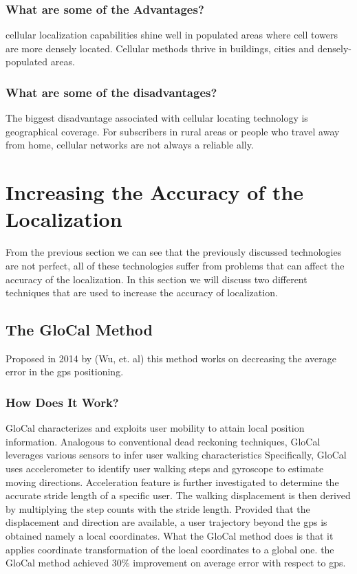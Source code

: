 \subsubsection{What are some of the Advantages?}
cellular localization  capabilities shine well in populated areas where cell towers are more densely located.
Cellular methods thrive in buildings, cities and densely-populated areas.\cite{web:agmonitoring}

\subsubsection{What are some of the disadvantages?}
The biggest disadvantage associated with cellular locating technology is geographical coverage.
For subscribers in rural areas or people who travel away from home, cellular networks are not always a reliable ally.\cite{web:agmonitoring}

\section{Increasing the Accuracy of the Localization}
From the previous section we can see that the previously discussed technologies are not perfect, all of these technologies suffer from problems that can affect the accuracy of the localization. In this section we will discuss two different techniques that are used to increase the accuracy of localization.

\subsection{The GloCal Method}
Proposed in 2014 by (Wu, et. al)\cite{wu} this method works on decreasing the average error in the \ac{gps} positioning.

\subsubsection{How Does It Work?}
GloCal characterizes and exploits user mobility to attain local position information.
Analogous to conventional dead reckoning techniques, GloCal leverages various sensors to infer user walking characteristics Specifically, GloCal uses accelerometer to identify user walking steps and gyroscope to estimate moving directions.
Acceleration feature is further investigated to determine the accurate stride length of a specific user.
The walking displacement is then derived by multiplying the step counts with the stride length.
Provided that the displacement and direction are available, a user trajectory beyond the \ac{gps} is obtained namely a local coordinates.
What the GloCal method does is that it applies coordinate transformation of the local coordinates to a global one.
the GloCal method achieved  30\% improvement on average error with respect to \ac{gps}.

